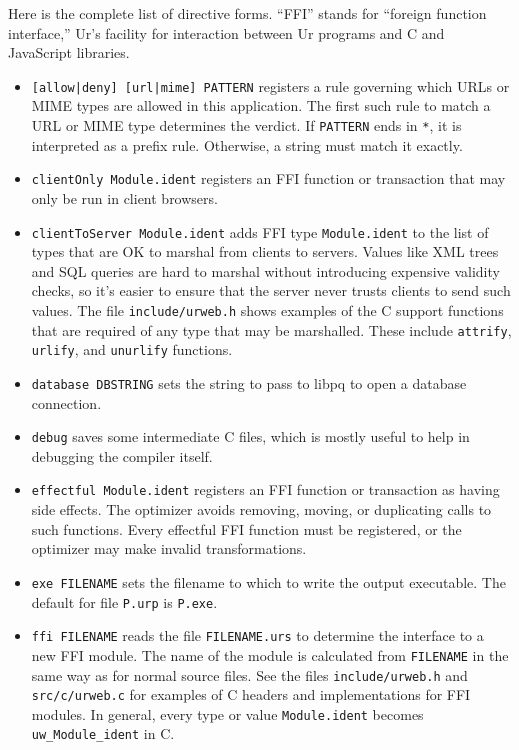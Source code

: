 \documentclass{article}
\begin{document}
Here is the complete list of directive forms.  ``FFI'' stands for ``foreign function interface,'' Ur's facility for interaction between Ur programs and C and JavaScript libraries.
\begin{itemize}
\item \texttt{[allow|deny] [url|mime] PATTERN} registers a rule governing which URLs or MIME types are allowed in this application.  The first such rule to match a URL or MIME type determines the verdict.  If \texttt{PATTERN} ends in \texttt{*}, it is interpreted as a prefix rule.  Otherwise, a string must match it exactly.
\item \texttt{clientOnly Module.ident} registers an FFI function or transaction that may only be run in client browsers.
\item \texttt{clientToServer Module.ident} adds FFI type \texttt{Module.ident} to the list of types that are OK to marshal from clients to servers.  Values like XML trees and SQL queries are hard to marshal without introducing expensive validity checks, so it's easier to ensure that the server never trusts clients to send such values.  The file \texttt{include/urweb.h} shows examples of the C support functions that are required of any type that may be marshalled.  These include \texttt{attrify}, \texttt{urlify}, and \texttt{unurlify} functions.
\item \texttt{database DBSTRING} sets the string to pass to libpq to open a database connection.
\item \texttt{debug} saves some intermediate C files, which is mostly useful to help in debugging the compiler itself.
\item \texttt{effectful Module.ident} registers an FFI function or transaction as having side effects.  The optimizer avoids removing, moving, or duplicating calls to such functions.  Every effectful FFI function must be registered, or the optimizer may make invalid transformations.
\item \texttt{exe FILENAME} sets the filename to which to write the output executable.  The default for file \texttt{P.urp} is \texttt{P.exe}.  
\item \texttt{ffi FILENAME} reads the file \texttt{FILENAME.urs} to determine the interface to a new FFI module.  The name of the module is calculated from \texttt{FILENAME} in the same way as for normal source files.  See the files \texttt{include/urweb.h} and \texttt{src/c/urweb.c} for examples of C headers and implementations for FFI modules.  In general, every type or value \texttt{Module.ident} becomes \texttt{uw\_Module\_ident} in C.

\end{itemize}
\end{document}
